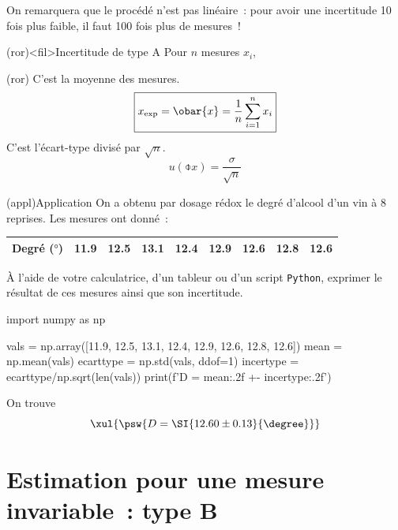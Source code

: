 \documentclass[../main/main.tex]{subfiles}
\begin{document}
On remarquera que le procédé n'est pas linéaire~: pour avoir une incertitude 10
fois plus faible, il faut 100 fois plus de mesures~!

\begin{tcb}(ror)<fil>{Incertitude de type A}
	Pour $n$ mesures $x_i$,
	\smallbreak
	\begin{isd}[cnt](ror)
		C'est la moyenne des mesures.
		\[
			\boxed{x_{\rm exp} = \obar{x} = \frac{1}{n} \sum_{i=1}^{n} x_i}
		\]
		\tcblower
		C'est l'écart-type divisé par $\sqrt{n}$.
		\[
			\boxed{u(\obar{x}) = \frac{\sigma}{\sqrt{n}}}
		\]
	\end{isd}
\end{tcb}

\begin{tcb}(appl){Application}
	On a obtenu par dosage rédox le degré d'alcool d'un vin à 8 reprises. Les
	mesures ont donné~:
	\begin{center}
		\begin{tabular}{lcccccccc}
			\toprule
			Degré ($\si{\degree}$) &
			\num{11.9}             &
			\num{12.5}             &
			\num{13.1}             &
			\num{12.4}             &
			\num{12.9}             &
			\num{12.6}             &
			\num{12.8}             &
			\num{12.6}
			\\
			\bottomrule
		\end{tabular}
	\end{center}
	À l'aide de votre calculatrice, d'un tableur ou d'un script \texttt{Python},
	exprimer le résultat de ces mesures ainsi que son incertitude.
	\tcblower
	\begin{python}
		import numpy as np

		vals = np.array([11.9, 12.5, 13.1, 12.4, 12.9, 12.6, 12.8, 12.6])
		mean = np.mean(vals)
		ecarttype = np.std(vals, ddof=1)
		incertype = ecarttype/np.sqrt(len(vals))
		print(f'D = {mean:.2f} +- {incertype:.2f}')
	\end{python}
	On trouve
	\[
		\xul{
			\psw{
				D = \SI{12.60 \pm  0.13}{\degree}
			}
		}
	\]
\end{tcb}

\section{Estimation pour une mesure invariable~: type B}
\end{document}
